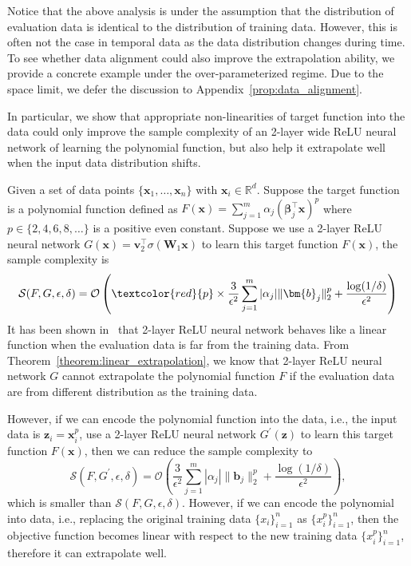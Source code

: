 Notice that the above analysis is under the assumption that the distribution of evaluation data is identical to the distribution of training data. However, this is often not the case in temporal data as the data distribution changes during time. 
To see whether data alignment could also improve the extrapolation ability, we provide a concrete example under the over-parameterized regime. 
Due to the space limit, we defer the discussion to Appendix~\ref{prop:data_alignment}.

In particular, we show that appropriate non-linearities of target function into the data could only improve the sample complexity of an 2-layer wide ReLU neural network of learning the polynomial function, but also help it extrapolate well when the input data distribution shifts.




\begin{corollary}\label{corollary:data_alignment_better_generalization}
Given a set of data points $\{\mathbf{x}_1,\ldots, \mathbf{x}_n\}$ with $\mathbf{x}_i\in\mathbb{R}^d$. Suppose the target function is a polynomial function defined as $F(\mathbf{x}) = \sum_{j=1}^m \alpha_j (\bm{\beta}_j^\top \mathbf{x})^p$ where $p\in\{2,4,6,8,\ldots\}$ is a positive even constant. Suppose we use a 2-layer ReLU neural network $G(\mathbf{x})  = \mathbf{v}_2^\top\sigma(\mathbf{W}_1 \mathbf{x}) $ to learn this target function $F(\mathbf{x})$, the sample complexity is  
\begin{equation}
    \mathcal{S}(F, G, \epsilon, \delta) = \mathcal{O}\left(\textcolor{red}{p} \times \frac{3}{\epsilon^2}\sum_{j=1}^m |\alpha_j| \| \bm{b}_j\|_2^p + \frac{\log(1/\delta)}{\epsilon^2}\right)
\end{equation}
It has been shown in~\cite{xu2020neural} that 2-layer ReLU neural network behaves like a linear function when the evaluation data is far from the training data. From Theorem~\ref{theorem:linear_extrapolation}, we know that 2-layer ReLU neural network $G$ cannot extrapolate the polynomial function $F$ if the evaluation data are from different distribution as the training data.

However, if we can encode the polynomial function into the data, i.e., the input data is $\mathbf{z}_i = \mathbf{x}_i^p$, use a 2-layer ReLU neural network $G^\prime(\mathbf{z})$ to learn this target function $F(\mathbf{x})$, then we can reduce the sample complexity to
\begin{equation}
    \mathcal{S}(F, G^\prime, \epsilon, \delta) = \mathcal{O}\left(\frac{3}{\epsilon^2}\sum_{j=1}^m  |\alpha_j| \| \bm{b}_j\|_2^p + \frac{\log(1/\delta)}{\epsilon^2}\right),
\end{equation}
which is smaller than $\mathcal{S}(F, G, \epsilon, \delta)$. 
 However, if we can encode the polynomial into data, i.e., replacing the original training data $\{ x_i \}_{i=1}^n$ as $\{ x_i^p \}_{i=1}^n$, then the objective function becomes linear with respect to the new training data $\{ x_i^p \}_{i=1}^n$, therefore it can extrapolate well.
 
\end{corollary}

